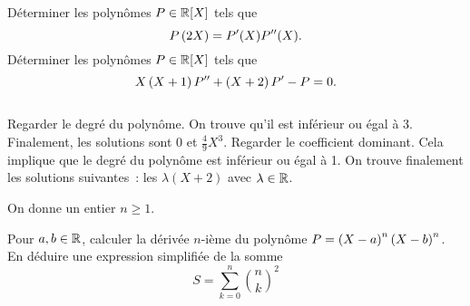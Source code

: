 \documentclass{magnolia}
\begin{document}



\begin{questions}
\question Déterminer les polynômes $P\in\polyR$ tels que
  \[P\left(2X\right)=P'(X)P''(X).\]
\question Déterminer les polynômes $P\in\polyR$ tels que
  \[X\left(X+1\right)P''+\left(X+2\right)P'-P=0.\]
\end{questions}
\begin{sol}
$\quad$
\begin{questions}
\question Regarder le degré du polynôme. On trouve qu'il est inférieur ou égal
  à 3. Finalement, les solutions sont $0$ et $\frac{4}{9}X^3$.
\question Regarder le coefficient dominant. Cela implique que le degré du
  polynôme est inférieur ou égal à 1. On trouve finalement les solutions
  suivantes~: les $\lambda(X+2)$ avec $\lambda\in\mathbb{R}$.
\end{questions}
\end{sol}


On donne un entier $n\geq 1$.
\begin{questions}
\question Pour $a,b\in\mathbb{R}$, calculer la dérivée $n$-ième du polynôme
  $P=\left(X-a\right)^n\left(X-b\right)^n$.
\question En déduire une expression simplifiée de la somme
  \[S=\sum_{k=0}^n \binom{n}{k}^2\]
\end{questions}

\end{document}
